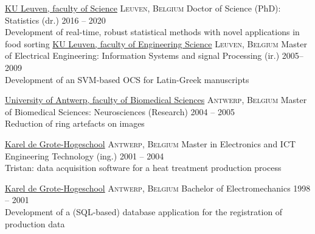 \documentclass[10pt,a4paper]{article}
\begin{document}
\spacedhrule{-0.2em}{-0.4em}
\newpage
{}

\headedsection
  {\href{https://wet.kuleuven.be/english}{KU Leuven, faculty of Science}}
  {\textsc{Leuven, Belgium}} {%
  \headedsubsection
    {Doctor of Science (PhD): Statistics (dr.)}
    {2016 -- 2020}{\\Development of real-time, robust statistical methods with novel applications in food sorting}
}
\vspace{+0.2em}
\headedsection
  {\href{https://eng.kuleuven.be/en}{KU Leuven, faculty of Engineering Science}}
  {\textsc{Leuven, Belgium}} {%
  \headedsubsection
    {Master of Electrical Engineering: Information Systems and signal Processing (ir.)}
    {2005--2009} {\\Development of an SVM-based OCS for Latin-Greek manuscripts}
}

\vspace{+0.2em}
\headedsection
  {\href{https://www.uantwerpen.be/en/}{University of Antwerp, faculty of Biomedical Sciences}}
  {\textsc{Antwerp, Belgium}} {%
  \headedsubsection
    {Master of Biomedical Sciences: Neurosciences (Research)}
    {2004 -- 2005} {\\Reduction of ring artefacts on  images}
}

\vspace{+0.2em}
\headedsection
{\href{https://www.kdg.be/}{Karel de Grote-Hogeschool}}
{\textsc{Antwerp, Belgium}} {%
	\headedsubsection
	{Master in Electronics and ICT Engineering Technology (ing.)}
	{2001 -- 2004} {\\Tristan: data acquisition software for a heat treatment production process}
}

\vspace{+0.2em}
\headedsection
{\href{https://www.kdg.be/}{Karel de Grote-Hogeschool}}
{\textsc{Antwerp, Belgium}} {%
	\headedsubsection
	{Bachelor of Electromechanics}
	{1998 -- 2001} {\\Development of a (SQL-based) database application for the registration of production data}
}

\spacedhrule{0.5em}{-0.4em}

\end{document}
